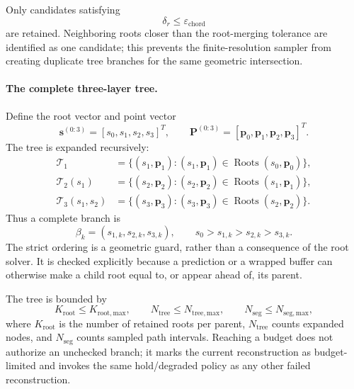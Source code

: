 \documentclass[12pt,a4paper]{report}
\begin{document}
Only candidates satisfying
\begin{equation}
\delta_r\leq\varepsilon_{\mathrm{chord}}
\tag{8.90}
\label{eq:ch8-root-residual-guard}
\end{equation}
are retained. Neighboring roots closer than the root-merging tolerance are
identified as one candidate; this prevents the finite-resolution sampler from
creating duplicate tree branches for the same geometric intersection.

\paragraph{The complete three-layer tree.}
Define the root vector and point vector
\begin{equation}
\mathbf{s}^{(0:3)}=[s_0,s_1,s_2,s_3]^T,\qquad
\mathbf{P}^{(0:3)}=[\mathbf{p}_0,\mathbf{p}_1,\mathbf{p}_2,\mathbf{p}_3]^T .
\tag{8.91}
\label{eq:ch8-root-vector}
\end{equation}
The tree is expanded recursively:
\begin{align}
\mathcal{T}_1&=
\bigl\{(s_1,\mathbf{p}_1):
(s_1,\mathbf{p}_1)\in\operatorname{Roots}(s_0,\mathbf{p}_0)\bigr\},
\tag{8.92}\\
\mathcal{T}_2(s_1)&=
\bigl\{(s_2,\mathbf{p}_2):
(s_2,\mathbf{p}_2)\in\operatorname{Roots}(s_1,\mathbf{p}_1)\bigr\},
\tag{8.93}\\
\mathcal{T}_3(s_1,s_2)&=
\bigl\{(s_3,\mathbf{p}_3):
(s_3,\mathbf{p}_3)\in\operatorname{Roots}(s_2,\mathbf{p}_2)\bigr\}.
\tag{8.94}
\end{align}
Thus a complete branch is
\begin{equation}
\beta_k=(s_{1,k},s_{2,k},s_{3,k}),\qquad
s_0>s_{1,k}>s_{2,k}>s_{3,k}.
\tag{8.95}
\label{eq:ch8-complete-branch}
\end{equation}
The strict ordering is a geometric guard, rather than a consequence of the
root solver. It is checked explicitly because a prediction or a wrapped
buffer can otherwise make a child root equal to, or appear ahead of, its
parent.

The tree is bounded by
\begin{equation}
K_{\mathrm{root}}\leq K_{\mathrm{root,max}},\qquad
N_{\mathrm{tree}}\leq N_{\mathrm{tree,max}},\qquad
N_{\mathrm{seg}}\leq N_{\mathrm{seg,max}},
\tag{8.96}
\label{eq:ch8-tree-budget}
\end{equation}
where $K_{\mathrm{root}}$ is the number of retained roots per parent,
$N_{\mathrm{tree}}$ counts expanded nodes, and $N_{\mathrm{seg}}$ counts
sampled path intervals. Reaching a budget does not authorize an unchecked
branch; it marks the current reconstruction as budget-limited and invokes the
same hold/degraded policy as any other failed reconstruction.
\end{document}
